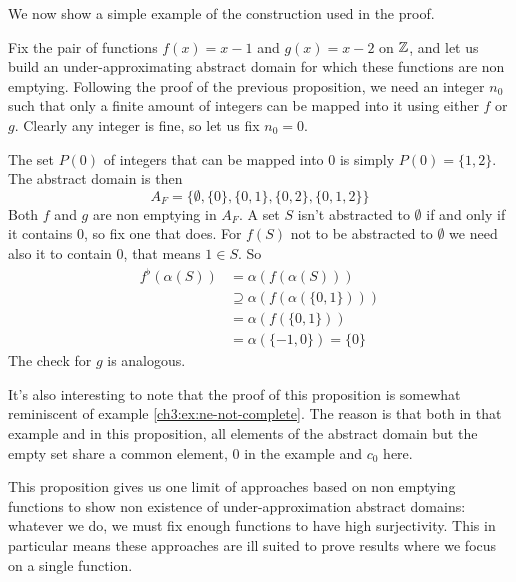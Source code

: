 We now show a simple example of the construction used in the proof.
\begin{example}
	Fix the pair of functions $f(x) = x - 1$ and $g(x) = x - 2$ on $\mathbb{Z}$, and let us build an under-approximating abstract domain for which these functions are non emptying. Following the proof of the previous proposition, we need an integer $n_0$ such that only a finite amount of integers can be mapped into it using either $f$ or $g$. Clearly any integer is fine, so let us fix $n_0 = 0$.

	The set $P(0)$ of integers that can be mapped into $0$ is simply $P(0) = \{ 1, 2 \}$. The abstract domain is then
	\[
	A_F = \{ \emptyset, \{ 0 \}, \{ 0, 1 \}, \{ 0, 2 \}, \{ 0, 1, 2 \} \}
	\]
	Both $f$ and $g$ are non emptying in $A_F$. A set $S$ isn't abstracted to $\emptyset$ if and only if it contains $0$, so fix one that does.
	For $f(S)$ not to be abstracted to $\emptyset$ we need also it to contain $0$, that means $1 \in S$. So
	\begin{align*}
		f^{\flat}(\alpha(S)) &= \alpha(f(\alpha(S))) \\
		&\supseteq \alpha(f(\alpha(\{ 0, 1 \}))) \\
		&= \alpha(f(\{ 0, 1 \})) \\
		&= \alpha(\{ -1, 0 \}) = \{ 0 \}
	\end{align*}
	The check for $g$ is analogous.
\end{example}
It's also interesting to note that the proof of this proposition is somewhat reminiscent of example \ref{ch3:ex:ne-not-complete}. The reason is that both in that example and in this proposition, all elements of the abstract domain but the empty set share a common element, $0$ in the example and $c_0$ here.

This proposition gives us one limit of approaches based on non emptying functions to show non existence of under-approximation abstract domains: whatever we do, we must fix enough functions to have high surjectivity. This in particular means these approaches are ill suited to prove results where we focus on a single function.

